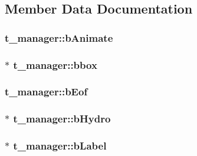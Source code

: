 \subsection{\-Member \-Data \-Documentation}
\hypertarget{structt__manager_a056cb8596aa68877d8a3eb1d0e8dd749}{
\subsubsection[{b\-Animate}]{ {\bf t\-\_\-manager\-::b\-Animate}}}\label{structt__manager_a056cb8596aa68877d8a3eb1d0e8dd749}
\hypertarget{structt__manager_aa564b275efd3a20c9d305c88bd8429b1}{
\subsubsection[{bbox}]{$\ast$ {\bf t\-\_\-manager\-::bbox}}}\label{structt__manager_aa564b275efd3a20c9d305c88bd8429b1}
\hypertarget{structt__manager_a531f42654d7a51df1232cf7c157fe0ef}{
\subsubsection[{b\-Eof}]{ {\bf t\-\_\-manager\-::b\-Eof}}}\label{structt__manager_a531f42654d7a51df1232cf7c157fe0ef}
\hypertarget{structt__manager_ac32e2900cbac86f59ac3ed9af7ae9076}{
\subsubsection[{b\-Hydro}]{$\ast$ {\bf t\-\_\-manager\-::b\-Hydro}}}\label{structt__manager_ac32e2900cbac86f59ac3ed9af7ae9076}
\hypertarget{structt__manager_a6ae8e3d24314f737d16fb866164648ba}{
\subsubsection[{b\-Label}]{$\ast$ {\bf t\-\_\-manager\-::b\-Label}}}\label{structt__manager_a6ae8e3d24314f737d16fb866164648ba}
